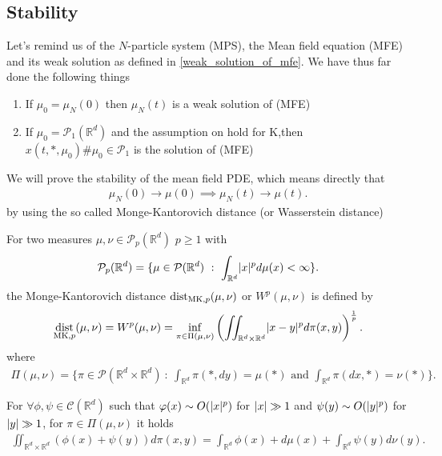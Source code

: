 \subsection{Stability}
Let's remind us of the $N$-particle system (MPS), the Mean field equation (MFE) and its weak solution as defined in \autoref{weak_solution_of_mfe}.
We have thus far done the following things 
\begin{enumerate}
  \item If $\mu_0 = \mu_N(0)$  then $\mu_N(t)$ is a weak solution of (MFE)
  \item If $\mu_0 = \mathcal{P}_1(\mathbb{R}^{d} )$ and the assumption on  hold for K,then\\
    $x(t,*,\mu_0) \# \mu_0 \in  \mathcal{P}_1$ is the solution of (MFE)
\end{enumerate}
We will prove the stability of the mean field PDE, which means directly that 
\begin{align*}
  \mu_N(0) \to \mu(0) \implies \mu_{N}(t) \to \mu(t)
.\end{align*}
by using the so called Monge-Kantorovich distance (or Wasserstein distance) 
\begin{definition}
 For two measures $\mu ,\nu  \in  \mathcal{P}_p(\mathbb{R}^{d} )$  $p\ge 1$ with 
 \begin{align*}
   \mathcal{P}_p(\mathbb{R}^{d} ) = \{\mu  \in  \mathcal{P}(\mathbb{R}^{d}) \ : \ \int_{\mathbb{R}^{d} } \lvert x\rvert^{p} d\mu(x) <\infty  \}  
 .\end{align*}
 the Monge-Kantorovich distance $\operatorname*{dist}_{\text{MK},p}(\mu ,\nu )$ or $W^{p}(\mu ,\nu ) $ is defined by 
 \begin{align*}
   \operatorname*{dist}_{\text{MK},p}(\mu ,\nu ) = W^{p}(\mu ,\nu )  = \inf_{\pi  \in  \Pi(\mu ,\nu )}\left( \iint_{\mathbb{R}^{d} \times  \mathbb{R}^{d}  } \lvert x-y\rvert^{p} d\pi(x,y) \right)^{\frac{1}{p}} 
 .\end{align*}
 where 
 \begin{align*}
   \Pi(\mu ,\nu ) = \{\pi  \in  \mathcal{P}(\mathbb{R}^{d} \times  \mathbb{R}^{d}  ) \ : \ \int_{\mathbb{R}^{d} }\pi(*,dy) = \mu(*) \text{ and } \int_{\mathbb{R}^{d} } \pi(dx,*) = \nu(*)\}  
 .\end{align*}
\end{definition}
\begin{remark}
 For $\forall \phi ,\psi  \in  \mathcal{C}(\mathbb{R}^{d} )$  such that $\varphi(x) \sim O(\lvert x\rvert^{p} )$ for $\lvert x\rvert \gg 1$ and $\psi(y) \sim O(\lvert y\rvert^{p} )$ for 
 $\lvert y\rvert \gg 1$, for $\pi \in  \Pi(\mu,\nu ) $ it holds 
 \begin{align*}
   \iint_{\mathbb{R}^{d} \times  \mathbb{R}^{d}  } (\phi(x)+\psi(y)) d\pi(x,y) = \int_{\mathbb{R}^{d} } \phi(x) + d\mu(x) + \int_{\mathbb{R}^{d} } \psi(y) d\nu(y)
 .\end{align*}
\end{remark}
